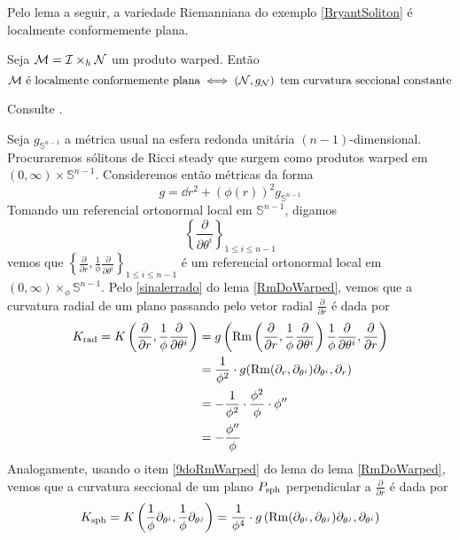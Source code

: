 Pelo lema a seguir, a variedade Riemanniana do exemplo \cref{BryantSoliton} é localmente conformemente plana.

\begin{lema}\label{LemaGarciaRio}
Seja $\mathcal{M} = \mathcal{I} \times_{h} \mathcal{N}$ um produto warped. Então
\[
\mathcal{M} \text{ é localmente conformemente plana} \iff \left(  \mathcal{N}, g_{\mathcal{N}}  \right) \text{ tem curvatura seccional constante}
\]
\end{lema}

\begin{demm}
Consulte .
\end{demm}

\begin{exem}\label{BryantSoliton}
Seja $g_{\mathbb{S}^{n-1}}$ a métrica usual na esfera redonda unitária $(n-1)$-dimensional. Procuraremos sólitons de Ricci steady que surgem como produtos warped em $(0, \infty) \times \mathbb{S}^{n-1}$. Consideremos então métricas da forma
\[
g = \dd r^2 + (\phi(r))^2 g_{\mathbb{S}^{n-1}}
\]
Tomando um referencial ortonormal local em $\mathbb{S}^{n-1}$, digamos \[
\left\{\frac{\partial}{\partial \theta^i} \right\}_{1 \leq i \leq n-1}
\]
vemos que $\left\{\frac{\partial}{\partial r}, \frac{1}{\phi} \frac{\partial}{\partial \theta^i} \right\}_{1 \leq i \leq n -1}$ é um referencial ortonormal local em $(0, \infty) \times_{\phi} \mathbb{S}^{n-1}$. Pelo \cref{sinalerrado} do lema \cref{RmDoWarped}, vemos que a curvatura radial de um plano passando pelo vetor radial $\frac{\partial}{\partial r}$ é dada por
\[ \begin{aligned}
K_{{\rm rad}} = K\left(\frac{\partial}{\partial r}, \frac{1}{\phi} \frac{\partial}{\partial \theta^i}\right) &= g\left(\mathrm{Rm}\left( \frac{\partial}{\partial r}, \frac{1}{\phi} \frac{\partial}{\partial \theta^i}\right)\frac{1}{\phi} \frac{\partial}{\partial \theta^i} , \frac{\partial}{\partial r}\right) \\
&= \frac{1}{\phi^2} \cdot g(\mathrm{Rm}(\partial_r, \partial_{\theta^i}) \partial_{\theta^i}, \partial_r) \\
&= -\frac{1}{\phi^2} \cdot \frac{\phi^2}{\phi} \cdot \phi'' \\
&= -\frac{\phi''}{\phi}
\end{aligned}
\]
Analogamente, usando o item \cref{9doRmWarped} do lema do lema \cref{RmDoWarped}, vemos que a curvatura seccional de um plano $P_{{\rm sph}}$ perpendicular a $\frac{\partial}{\partial r}$ é dada por
\[ \begin{aligned}
K_{{\rm sph}} = K\left(\frac{1}{\phi} \partial_{\theta^i}, \frac{1}{\phi} \partial_{\theta^j} \right) &= \frac{1}{\phi^4} \cdot g\left( \Rm(\partial_{\theta^i}, \partial_{\theta^j}) \partial_{\theta^j}, \partial_{\theta^i} \right) \\

\end{aligned}\]
\end{exem}
